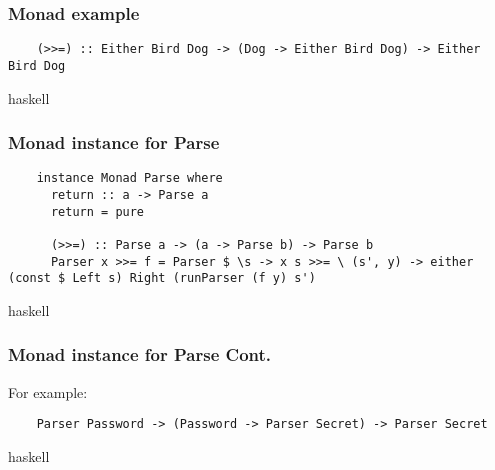 \documentclass{beamer}
\begin{document}
\begin{frame}
  \frametitle{Monad example}

  \begin{verbatim}
    (>>=) :: Either Bird Dog -> (Dog -> Either Bird Dog) -> Either Bird Dog
  \end{verbatim}{haskell}


\end{frame}


\begin{frame}
  \frametitle{Monad instance for Parse}


  \begin{verbatim}
    instance Monad Parse where
      return :: a -> Parse a
      return = pure

      (>>=) :: Parse a -> (a -> Parse b) -> Parse b
      Parser x >>= f = Parser $ \s -> x s >>= \ (s', y) -> either (const $ Left s) Right (runParser (f y) s')
  \end{verbatim}{haskell}

\end{frame}


\begin{frame}
  \frametitle{Monad instance for Parse Cont.}

  For example:

  \begin{verbatim}
    Parser Password -> (Password -> Parser Secret) -> Parser Secret
  \end{verbatim}{haskell}


\end{frame}
\end{document}

